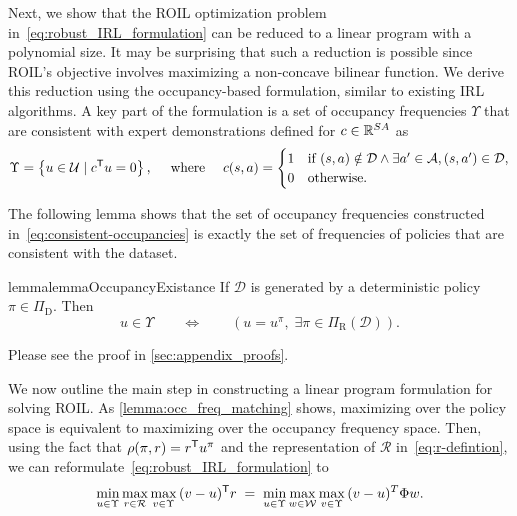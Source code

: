 \documentclass[10pt]{article}
\theoremstyle{plain}
\theoremstyle{remark}
\begin{document}
Next, we show that the ROIL optimization problem in~\eqref{eq:robust_IRL_formulation} can be reduced to a linear program with a polynomial size. It may be surprising that such a reduction is possible since ROIL's objective involves maximizing a non-concave bilinear function. We derive this reduction using the occupancy-based formulation, similar to existing IRL algorithms. A key part of the formulation is a set of occupancy frequencies $\Upsilon$ that are consistent with expert demonstrations defined for $c\in \mathbb{R}^{SA}$ as 
%
\begin{equation}\label{eq:consistent-occupancies}
  \Upsilon = \left\{ u \in \mathcal{U} \mid c^{\mathsf{T}} u = 0  \right\},
  \quad
  \text{ where }
  \quad
  c(s,a) =
  \begin{cases}
    1 &\text{if  }
        (s,a) \notin \mathcal{D} \wedge
        \exists a'\in \mathcal{A}, (s, a') \in \mathcal{D}, \\
    0 & \text{otherwise}.
  \end{cases}
\end{equation}




The following lemma shows that the set of occupancy frequencies constructed in~\eqref{eq:consistent-occupancies} is exactly the set of frequencies of policies that are consistent with the dataset. 
\begin{restatable}{lemma}{lemmaOccupancyExistance}
\label{lemma:occ_freq_matching}
If $\mathcal{D}$ is generated by a deterministic policy $\pi \in \Pi_{\mathrm{D}}$. Then
\[
  u \in \Upsilon
  \qquad \Leftrightarrow \qquad
  \left(u = u^{\pi},\;  \exists \pi \in \Pi_{\mathrm{R}}(\mathcal{D})\right).
\]
\end{restatable}
Please see the proof in \cref{sec:appendix_proofs}.

We now outline the main step in constructing a linear program formulation for solving ROIL. As \cref{lemma:occ_freq_matching} shows,  maximizing over the policy space is equivalent to maximizing over the occupancy frequency space. Then, using the fact that $\rho(\pi,r) = r^{\mathsf{T}} u^{\pi}$ and the representation of $\mathcal{R}$ in~\eqref{eq:r-defintion}, we can reformulate~\eqref{eq:robust_IRL_formulation} to
%
\begin{equation} \label{eq:roil-occupancy}
    \min_{u \in \Upsilon} \max_{r \in \mathcal{R}} \max_{v \in \Upsilon} \, (v- u )^{\mathsf{T}}  r
    \; =\; 
    \min_{u \in \Upsilon} \max_{w \in \mathcal{W}} \max_{v \in \Upsilon} \, (v - u)^T \Phi w.
\end{equation}
%
\end{document}
